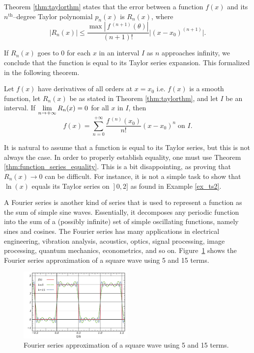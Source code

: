 Theorem \ref{thm:taylorthm} states that the error between a function $f(x)$ and its $n^\text{th}$--degree Taylor polynomial $p_n(x)$ is $R_n(x)$, where
$$ \big|R_n(x)\big| \leq \frac{\max\left|\,f\,^{(n+1)}(\theta)\right|}{(n+1)!}\big|(x-x_0)^{(n+1)}\big|.$$

If $R_n(x)$ goes to 0 for each $x$ in an interval $I$ as $n$ approaches infinity, we conclude that the function is equal to its Taylor series expansion. This formalized in the following theorem. 

\begin{theorem}\label{thm:function_series_equality}
Let $f(x)$ have derivatives of all orders at $x=x_0$ i.e. $f(x)$ is a smooth function, let $R_n(x)$ be as stated in Theorem \ref{thm:taylorthm}, and let $I$ be an interval. 
If $\displaystyle\lim_{n\to+\infty} R_n(x) = 0$ for all $x$ in $I$, then 
$$f(x) = \sum_{n=0}^{+\infty} \frac{f\,^{(n)}(x_0)}{n!}(x-x_0)^n\;  \text{on $I$}. $$
\end{theorem}

It is natural to assume that a function is equal to its Taylor series, but this is not always the case. In order to properly establish equality, one must use Theorem \ref{thm:function_series_equality}. This is a bit disappointing, as proving that $R_n(x)\to 0$ can be difficult. For instance, it is not a simple task to show that $\ln (x)$ equals  its Taylor series on $\left.\right]0,2]$ as found in Example \ref{ex_ts2}.

\begin{remark}
A Fourier series is another kind of series that is used to represent a function as the sum of simple sine waves. Essentially, it decomposes any periodic function  into the sum of a (possibly infinite) set of simple oscillating functions, namely sines and cosines. The Fourier series has many  applications in electrical engineering, vibration analysis, acoustics, optics, signal processing, image processing, quantum mechanics, econometrics, and so on. Figure~\ref{fig_series_19} shows the Fourier series approximation of a square wave using 5 and 15 terms. 

\begin{figure}[H]
	\begin{center}
			\includegraphics[width=0.5\textwidth]{fig_diff_19}
	\caption{ Fourier series approximation of a square wave using 5 and 15 terms.}
	\label{fig_series_19}
	\end{center}
\end{figure}


\end{remark}

